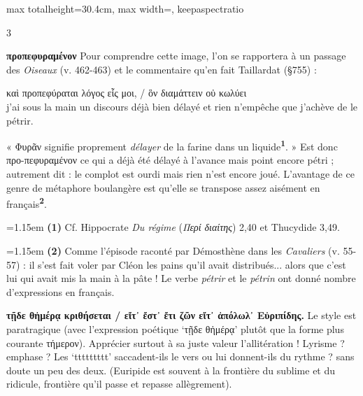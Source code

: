 \documentclass[11pt,twoside]{book}
\newcommand{\italique}[1]{\textit{#1}}
\newcommand{\citComm}[1]{\begin{quoting}[vskip=0.4pt,leftmargin=0.7em,rightmargin=0.2em]#1\end{quoting}}
\newcommand{\francais}[1]{{\policeFr #1}}
\newcommand{\marqueur}[1]{\textsuperscript{\color{rubricRed}\textbf{#1}}}
\begin{document}
\begin{adjustbox}{max totalheight=30.4cm, max width=\textwidth, keepaspectratio}
\begin{minipage}{\textwidth}
{\begin{multicols}{3}
\par\vspace{1.5pt}
 \textbf{προπεφυραμένον} Pour comprendre cette image, l'on se rapportera à un passage des \italique{Oiseaux} (v. 462-463) et le commentaire qu'en fait Taillardat (§755) :
\citComm{καὶ προπεφύραται λόγος εἷς μοι, / ὃν διαμάττειν οὐ κωλύει\\
\francais{j'ai sous la main un discours déjà bien délayé et rien n'empêche que j'achève de le pétrir.}}
\par\vspace{1.5pt}
\noindent « Φυρᾶν signifie proprement \italique{délayer} de la farine dans un liquide\marqueur{1}. » Est donc προ-πεφυραμένον ce qui a déjà été délayé à l'avance mais point encore pétri ; autrement dit : le complot est ourdi mais rien n'est encore joué. L'avantage de ce genre de métaphore boulangère est qu'elle se transpose assez aisément en français\marqueur{2}.
\par\vspace{1.5pt}
\par\vspace{1.2pt}\par\nopagebreak\vspace{1pt}\noindent\hangindent=1.15em {\color{sepiaNote}\textbf{(1)}} Cf. Hippocrate \italique{Du régime} (\italique{Περί διαίτης}) 2,40 et Thucydide 3,49.
\par\vspace{1.5pt}
\noindent\hangindent=1.15em {\color{sepiaNote}\textbf{(2)}} Comme l'épisode raconté par Démosthène dans les \italique{Cavaliers} (v. 55-57) : il s'est fait voler par Cléon les pains qu'il avait distribués... alors que c'est lui qui avait mis la main à la pâte ! Le verbe \italique{pétrir} et le \italique{pétrin} ont donné nombre d'expressions en français.
\par\vspace{1.5pt}
 \textbf{τῇδε θἠμέρᾳ κριθήσεται / εἴτ᾽ ἔστ᾽ ἔτι ζῶν εἴτ᾽ ἀπόλωλ᾽ Εὐριπίδης.} Le style est paratragique (avec l'expression poétique `τῇδε θἠμέρᾳ' plutôt que la forme plus courante τήμερον). Apprécier surtout à sa juste valeur l'allitération ! Lyrisme ? emphase ? Les `ttttttttt' saccadent-ils le vers ou lui donnent-ils du rythme ? sans doute un peu des deux. (Euripide est souvent à la frontière du sublime et du ridicule, frontière qu'il passe et repasse allègrement).
\par\end{multicols}}
\end{minipage}\end{adjustbox}
\end{document}
